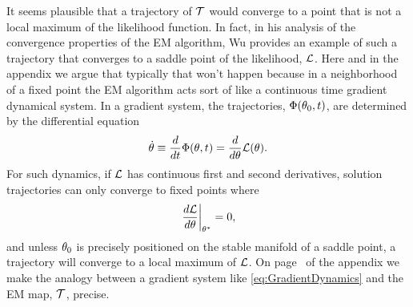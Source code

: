 It seems plausible that a trajectory of $\EMmap$ would converge to a
point that is not a local maximum of the likelihood function.  In
fact, in his analysis of the convergence properties of the EM
algorithm, Wu\cite{Wu83} provides an example of such a trajectory that
converges to a saddle point of the likelihood, $\LikelihoodFunction$.
Here and in the appendix we argue that typically that won't happen
because in a neighborhood of a fixed point the EM algorithm acts sort
of like a continuous time gradient dynamical system.  In a gradient
system, the trajectories, $\Phi(\theta_0, t)$, are determined by
the differential equation
\begin{equation}
  \label{eq:GradientDynamics}
  \dot \parameters \equiv \frac{d}{d t} \Phi(\parameters, t) =  \frac{d}{d \parameters} \LikelihoodFunction(\parameters).
\end{equation}
For such dynamics, if $\LikelihoodFunction$ has continuous first and
second derivatives, solution trajectories can only converge to fixed
points where
\begin{equation*}
  \left. \frac{d \LikelihoodFunction}{d \parameters} \right|_\EMfixedPoint = 0,
\end{equation*}
and unless $\theta_0$ is precisely positioned on the stable
manifold of a saddle point, a trajectory will converge to a local
maximum of $\LikelihoodFunction$.  On page~\pageref{chap:em_appendix}
of the appendix we make the analogy between a gradient system like
\eqref{eq:GradientDynamics} and the EM map, $\EMmap$, precise.

